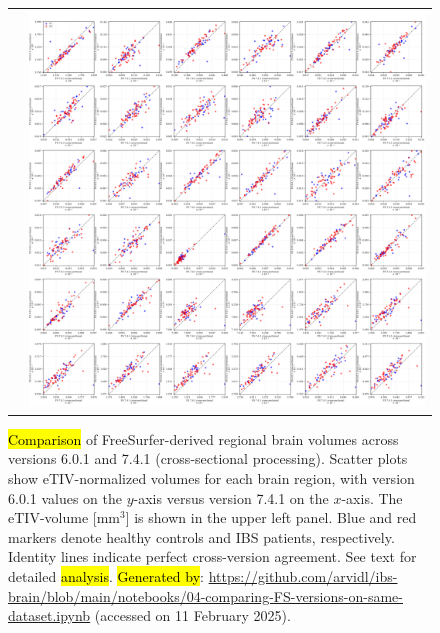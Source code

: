 \documentclass[diagnostics,article,accept,pdftex,moreauthors]{Definitions/mdpi}
\begin{document}
\vspace{-9pt}
\begin{figure}[H]


\begin{tabular}{ll}
\hspace{-12mm} & \includegraphics[width=1.05\textwidth]{figs/fs6_cross_vs_fs7_cross_version_comparison_new.png}
\end{tabular}

\caption{{\hl{Comparison} %
 of FreeSurfer-derived regional brain volumes across versions 6.0.1 and 7.4.1 (cross-sectional processing)}. {Scatter plots show} eTIV-normalized volumes for each brain region, with version 6.0.1 values on the $y$-axis versus version 7.4.1 on the $x$-axis. The eTIV-volume [mm$^3$] is shown in the upper left panel. Blue and red markers denote healthy controls and IBS patients, respectively. Identity lines indicate perfect cross-version agreement. See text for detailed \hl{analysis}. %
{\hl{Generated by}: {{ \url{https://github.com/arvidl/ibs-brain/blob/main/notebooks/04-comparing-FS-versions-on-same-dataset.ipynb}}}} (accessed on 11 February 2025).}
\label{fig:fs6_cross_vs_fs7_cross_version_comparison}
\end{figure} 
\end{document}
